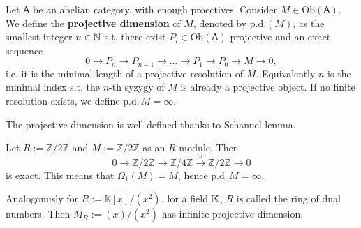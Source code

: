 \begin{defn}
	Let $\mathsf{A}$ be an abelian category, with enough proectives.
	Consider $M \in \mathrm{Ob} \left(\mathsf{A}\right)$.
	We define the \textbf{projective dimension} of $M$, denoted by $\mathrm{p.d.}(M)$, 
	as the smallest integer $n \in \mathbb{N}$ s.t. there exist $P_i \in \mathrm{Ob} \left(\mathsf{A}\right)$
	projective and an exact sequence
	\begin{equation}
	0 \to P_n \to P_{n-1} \to \ldots \to P_1 \to P_0 \to M \to 0
	,\end{equation} 
	i.e. it is the minimal length of a projective resolution of $M$.
	Equivalently $n$ is the minimal index s.t. the $n$-th syzygy of $M$ is
	already a projective object.
	If no finite resolution exists, we define $\mathrm{p.d.}\, M = \infty$.
\end{defn}

\begin{rem}[]
	The projective dimension is well defined thanks to Schanuel lemma.
\end{rem}

\begin{ex}
	Let $R := \mathbb{Z}/2\mathbb{Z}$ and $M := \mathbb{Z}/2\mathbb{Z}$ as an $R$-module.
	Then
	\begin{equation}
	0 \to \mathbb{Z}/2\mathbb{Z} \to \mathbb{Z}/4\mathbb{Z} \xrightarrow{\pi} \mathbb{Z}/2\mathbb{Z} \to 0
	\end{equation} 
	is exact.
	This means that $\Omega_1(M) = M$, hence $\mathrm{p.d.}\, M = \infty$.

	Analogouusly for $R := \mathbb{K}[x]/ \left( x^2 \right)$, for a field $\mathbb{K}$,
	$R$ is called the ring of dual numbers.
	Then $M_R := (x) / (x^2)$ has infinite projective dimension.
\end{ex} 


